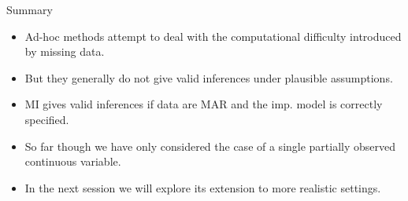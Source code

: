 \documentclass[ignorenonframetext,]{beamer}
\providecommand{\tightlist}{%
  \setlength{\itemsep}{0pt}\setlength{\parskip}{0pt}}
\begin{document}
\begin{frame}{Summary}
\protect\hypertarget{summary}{}

\begin{itemize}
\tightlist
\item
  Ad-hoc methods attempt to deal with the computational difficulty
  introduced by missing data.
\item
  But they generally do not give valid inferences under plausible
  assumptions.
\item
  MI gives valid inferences if data are MAR and the imp. model is
  correctly specified.
\item
  So far though we have only considered the case of a single partially
  observed continuous variable.
\item
  In the next session we will explore its extension to more realistic
  settings.
\end{itemize}

\end{frame}
\end{document}
